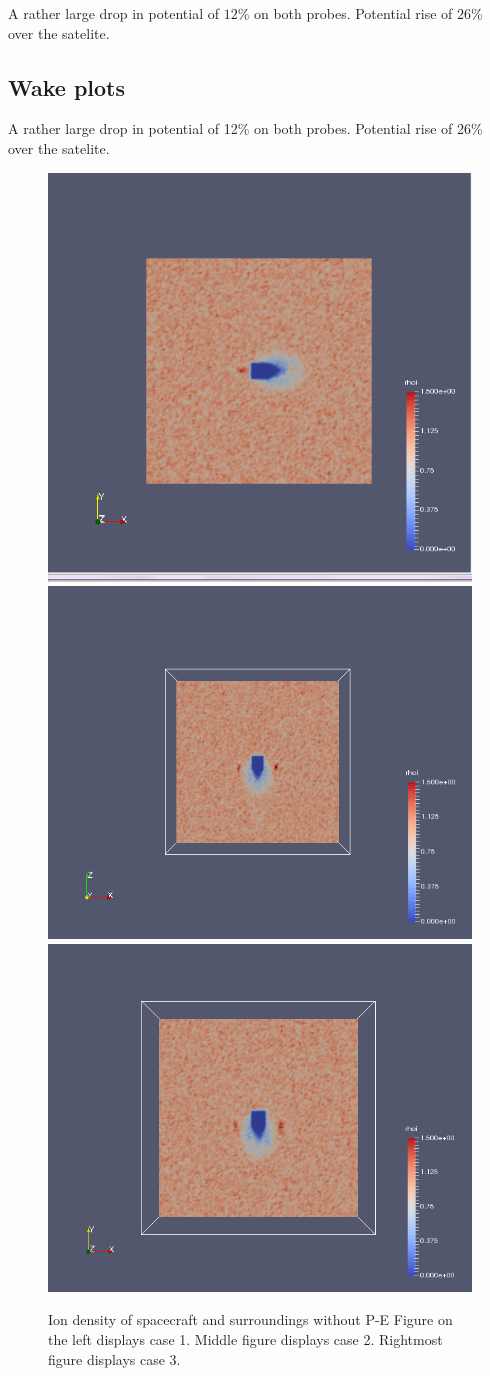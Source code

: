 A rather large drop in potential of \( 12\)\% on both probes. Potential rise of \(26\)\% over the satelite.

\subsection{Wake plots}

A rather large drop in potential of 12\% on both probes. Potential rise of 26\% over the satelite.


    \begin{figure}
        \includegraphics[width = 0.3 \textwidth]{images/ion_density_case1}
        \includegraphics[width = 0.3 \textwidth]{images/ion_density_x-z_case2}
	\includegraphics[width = 0.3 \textwidth]{images/ion_density_x-y_case3}
        \caption{Ion density of spacecraft and surroundings without P-E Figure on the left displays case 1. Middle figure displays case 2. Rightmost figure displays case 3.}
    \end{figure}
